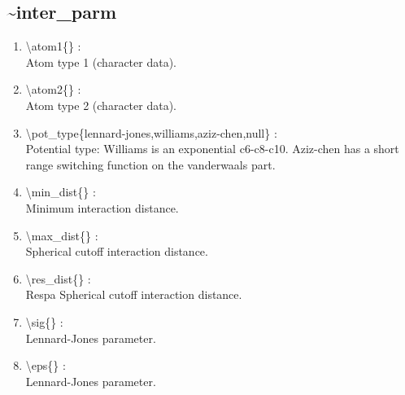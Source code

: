 \documentclass[12pt,titlepage]{article}
\begin{document}

\newpage
\subsection*{\bf \~{}inter\_parm}

\begin{enumerate}

 \vspace{0.15in} 
 \item  \textbackslash atom1\{\} : \\ 
    Atom type 1 (character data).

 \vspace{0.15in} 
 \item  \textbackslash atom2\{\} : \\ 
    Atom type 2 (character data).

 \vspace{0.15in} 
 \item  \textbackslash pot\_type\{lennard-jones,williams,aziz-chen,null\} : \\ 
    Potential type: Williams is an exponential c6-c8-c10. Aziz-chen has
    a short range switching function on the vanderwaals part.

 \vspace{0.15in} 
 \item  \textbackslash min\_dist\{\} : \\ 
    Minimum interaction distance.

 \vspace{0.15in} 
 \item  \textbackslash max\_dist\{\} : \\ 
    Spherical cutoff interaction distance.

 \vspace{0.15in} 
 \item  \textbackslash res\_dist\{\} : \\ 
    Respa Spherical cutoff interaction distance.

 \vspace{0.15in} 
 \item  \textbackslash sig\{\} : \\ 
    Lennard-Jones parameter.

 \vspace{0.15in} 
 \item  \textbackslash eps\{\} : \\ 
    Lennard-Jones parameter.


\end{enumerate}
\end{document}

